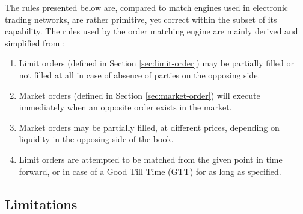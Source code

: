 The rules presented below are, compared to match engines used in electronic trading networks, are rather primitive, yet correct within the subset of its capability.
The rules used by the order matching engine are mainly derived and simplified from \cite{match-engine}:
\begin{enumerate}
    \item Limit orders (defined in Section \ref{sec:limit-order}) may be partially filled or not filled at all in case of absence of parties on the opposing side.
    
    \item Market orders (defined in Section \ref{sec:market-order}) will execute immediately when an opposite order exists in the market.
    
    \item Market orders may be partially filled, at different prices, depending on liquidity in the opposing side of the book.
    
    \item Limit orders are attempted to be matched from the given point in time forward, or in case of a Good Till Time (GTT) for as long as specified.
\end{enumerate}


\subsection{Limitations}

